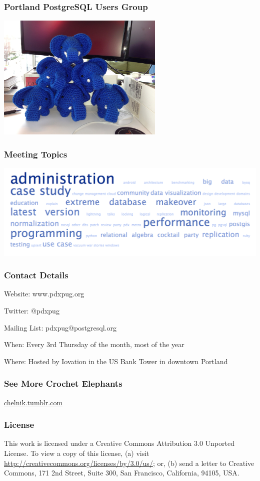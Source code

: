 \documentclass{beamer}
\begin{document}
\frame
{
  \frametitle{Portland PostgreSQL Users Group}
  \begin{center}
    \includegraphics[width=8cm]{chelnik-pyramid.jpg}
  \end{center}
}

\frame
{
  \frametitle{Meeting Topics}

  \begin{center}
  \includegraphics[width=\textwidth]{tag-cloud.png}
  \end{center}
}

\frame
{
  \frametitle{Contact Details}

  Website: www.pdxpug.org

  Twitter: @pdxpug

  Mailing List: pdxpug@postgresql.org

  When: Every 3rd Thursday of the month, most of the year

  Where: Hosted by Iovation in the US Bank Tower in downtown Portland
}

\frame
{
  \frametitle{See More Crochet Elephants}

  \begin{center}
    \huge \url{chelnik.tumblr.com}
  \end{center}
}


\frame
{
  \frametitle{License}

  This work is licensed under a Creative Commons Attribution 3.0
  Unported License. To view a copy of this license, (a) visit
  \url{http://creativecommons.org/licenses/by/3.0/us/}; or, (b) send a
  letter to Creative Commons, 171 2nd Street, Suite 300, San Francisco,
  California, 94105, USA.
}
\end{document}
